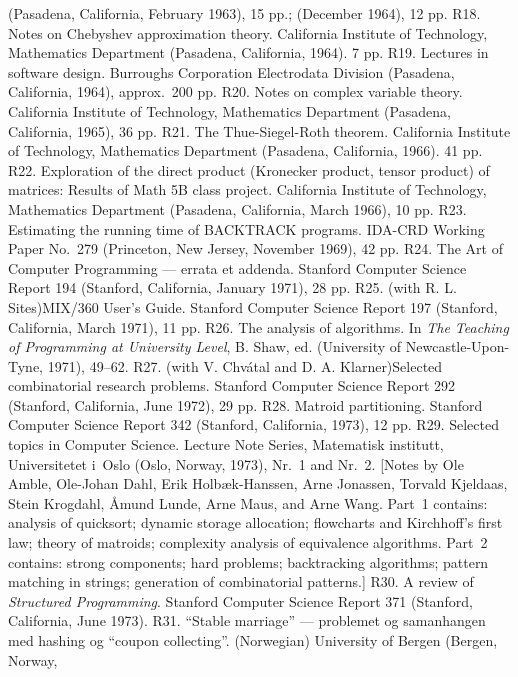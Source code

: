  (Pasadena, California, February 1963), 15 pp.;
 (December 1964), 12 pp.  
\p R18.  Notes on Chebyshev approximation theory.  California Institute
 of Tech\-nology, Mathematics Department (Pasadena, California, 1964).  7 pp.
\p R19.  Lectures in software design.  Burroughs Corporation
 Electrodata Division (Pasadena, California, 1964), approx.\ 200 pp.  
\p R20.  Notes on complex variable theory.  California Institute of
 Technology, Mathematics  Department (Pasadena, California, 1965), 36 pp.
\p R21.  The Thue-Siegel-Roth theorem.  California Institute of
 Technology, Mathematics Department (Pasadena, California, 1966).  41 pp.  
\p R22.  Exploration of the direct product (Kronecker product,
 tensor product) of matrices:  Results of Math 5B class project.
 California Institute of Technology, Mathematics Department
 (Pasadena, California, March 1966), 10 pp.  
\p R23.  Estimating the running time of BACKTRACK programs. 
 IDA-CRD Working Paper No.\ 279 (Princeton, New Jersey,
 November 1969), 42 pp.  
\p R24.  The Art of Computer Programming --- errata et addenda. 
 Stanford Computer Science Report 194 (Stanford, California,
 January 1971), 28 pp.  
\p R25.  (with R. L. Sites)\xskip  MIX/360 User's Guide.  
 Stanford Computer Science Report 197 (Stanford, California, March 
 1971), 11 pp.  
\p *R26.  The analysis of algorithms.  In {\sl The Teaching
 of Programming at University Level}, B. Shaw, ed. (University of
 Newcastle-Upon-Tyne, 1971), 49--62.  
\p R27.  (with V. Chv\'atal and D. A. Klarner)\xskip  Selected
 combinatorial research problems.  Stanford Computer Science
 Report 292 (Stanford, California, June 1972), 29 pp.  
\p R28.  Matroid partitioning.  Stanford Computer Science Report 342
 (Stanford, California, 1973), 12 pp.
\p *R29.  Selected topics in Computer Science.  Lecture Note Series,
 Matematisk institutt, Universitetet i~Oslo (Oslo, Norway, 1973),
 Nr.~1 and Nr.~2. [Notes by Ole Amble, Ole-Johan Dahl, Erik Holb{\ae}k-Hanssen,
 Arne Jonassen, Torvald Kjeldaas, Stein Krogdahl, \AA mund Lunde,
 Arne Maus, and Arne Wang. Part~1 contains: analysis of quicksort; dynamic
 storage allocation; flowcharts and Kirchhoff's first law; theory of matroids;
 complexity analysis of equivalence algorithms. Part~2 contains: strong
 components; hard problems; backtracking algorithms; pattern matching in
 strings; generation of combinatorial patterns.]
\p R30.  A review of {\sl Structured Programming}.  Stanford Computer
 Science Report 371 (Stanford, California, June 1973).  
\p *R31.  ``Stable marriage'' --- problemet og samanhangen med hashing og
 ``coupon collecting''.  (Norwegian) University of Bergen (Bergen, Norway,
